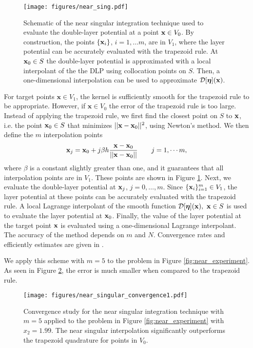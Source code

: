 \begin{figure}[!h]
\begin{center}
\texttt{[image: figures/near\_sing.pdf]}
\caption[Near singular integration scheme]{Schematic of the near singular integration technique used to evaluate the double-layer potential at a point ${\mathbf{x}}\in V_0$. By construction, the points $\{{\mathbf{x}}_i\}$, $i=1,\hdots m$, are in $V_1$, where the layer potential can be accurately evaluated with the trapezoid rule. At ${\mathbf{x}}_0\in S$ the double-layer potential is approximated with a local interpolant of the the DLP using collocation points on $S$. Then, a one-dimensional interpolation can be used to approximate $\mathcal{D}[\bm{\eta}]({\mathbf{x}})$.}\label{fig:ns_drawing}
\end{center}
\end{figure}

For target points $\mathbf{x}\in V_1$, the kernel is sufficiently smooth for the trapezoid rule to be appropriate. However, if $\mathbf{x}\in V_0$ the error of the trapezoid rule is too large. Instead of applying the trapezoid rule, we first find the closest point on $S$ to ${\mathbf{x}}$, i.e. the point ${\mathbf{x}}_0\in S$ that minimizes $||{\mathbf{x}}-{\mathbf{x}}_0||^2$, using Newton's method. We then define the $m$ interpolation points
	\[ {\mathbf{x}}_j = {\mathbf{x}}_0 + j\beta h\frac{\mathbf{x}-\mathbf{x}_0}{||\mathbf{x}-\mathbf{x}_0||} \qquad j = 1,\cdots m,\]
where $\beta$ is a constant slightly greater than one, and it guarantees that all interpolation points are in $V_1$. These points are shown in Figure \ref{fig:ns_drawing}. Next, we evaluate the double-layer potential at ${\mathbf{x}}_j$, $j=0,\hdots, m$. Since $\{{\mathbf{x}}_i\}_{i=1}^m\in V_1$, the layer potential at these points can be accurately evaluated with the trapezoid rule. A local Lagrange interpolant of the smooth function $\mathcal{D}[\bm{\eta}]({\mathbf{x}}),~{\mathbf{x}}\in S$ is used to evaluate the layer potential at ${\mathbf{x}}_0$. Finally, the value of the layer potential at the target point ${\mathbf{x}}$ is evaluated using a one-dimensional Lagrange interpolant. The accuracy of the method depends on $m$ and $N$. Convergence rates and efficiently estimates are given in \cite{Ying2006, Quaife2014}. 


We apply this scheme with $m=5$ to the problem in Figure \ref{fig:near_experiment}. As  seen in Figure \ref{fig:ns_convergence}, the error is much smaller when compared to the trapezoid rule.

\begin{figure}[!h]
\begin{center}
\texttt{[image: figures/near\_singular\_convergence1.pdf]}
\caption[Convergence of the near singular integration scheme.]{Convergence  study for the near singular integration technique with $m=5$ applied to the problem in Figure \ref{fig:near_experiment} with $x_2=1.99$. The near singular interpolation significantly outperforms the trapezoid quadrature for points in $V_0$. }\label{fig:ns_convergence}
\end{center}
\end{figure}


